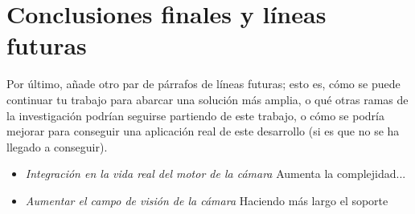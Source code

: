 \section{Conclusiones finales y líneas futuras}


Por último, añade otro par de párrafos de líneas futuras; esto es, cómo se puede continuar tu trabajo para abarcar una solución más amplia, o qué otras ramas de la investigación podrían seguirse partiendo de este trabajo, o cómo se podría mejorar para conseguir una aplicación real de este desarrollo (si es que no se ha llegado a conseguir).


\begin{itemize}
	\item \textit{Integración en la vida real del motor de la cámara} Aumenta la complejidad...
	\item \textit{Aumentar el campo de visión de la cámara} Haciendo más largo el soporte
\end{itemize}\

